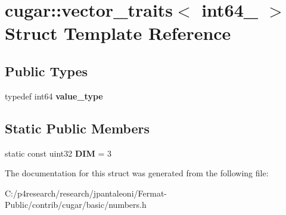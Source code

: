 \hypertarget{structcugar_1_1vector__traits_3_01int64__3_01_4}{}\section{cugar\+:\+:vector\+\_\+traits$<$ int64\+\_ $>$ Struct Template Reference}
\label{structcugar_1_1vector__traits_3_01int64__3_01_4}
\subsection*{Public Types}
\begin{DoxyCompactItemize}
\item 
\mbox{\label{structcugar_1_1vector__traits_3_01int64__3_01_4_a050adbb8e0890b8f8380d286ef61b2eb}} 
typedef int64 {\bfseries value\+\_\+type}
\end{DoxyCompactItemize}
\subsection*{Static Public Members}
\begin{DoxyCompactItemize}
\item 
\mbox{\label{structcugar_1_1vector__traits_3_01int64__3_01_4_a525ceef9f4d112ca7a426ba2b934d8cb}} 
static const uint32 {\bfseries D\+IM} = 3
\end{DoxyCompactItemize}


The documentation for this struct was generated from the following file\+:\begin{DoxyCompactItemize}
\item 
C\+:/p4research/research/jpantaleoni/\+Fermat-\/\+Public/contrib/cugar/basic/numbers.\+h\end{DoxyCompactItemize}
